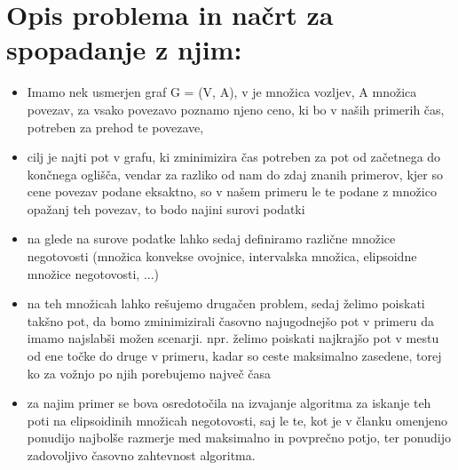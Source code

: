 \documentclass[a4paper, 12 pt]{article}
\theoremstyle{plain}
\theoremstyle{definition}
\theoremstyle{remark}
\begin{document}
\section{Opis problema in načrt za spopadanje z njim:}
\begin{itemize}
\item{Imamo nek usmerjen graf G = (V, A), v je množica vozljev, A množica povezav, za vsako povezavo poznamo njeno ceno, ki bo v naših primerih čas, potreben za prehod te povezave,}
\item{cilj je najti pot v grafu, ki zminimizira čas potreben za pot od začetnega do končnega oglišča, vendar za razliko od nam do zdaj znanih primerov, kjer so cene povezav podane eksaktno, so v našem primeru le te podane z množico opažanj teh povezav, to bodo najini surovi podatki}
\item{na glede na surove podatke lahko sedaj definiramo različne množice negotovosti (množica konvekse ovojnice, intervalska množica, elipsoidne množice negotovosti, ...)}
\item{na teh množicah lahko rešujemo drugačen problem, sedaj želimo poiskati takšno pot, da bomo zminimizirali časovno najugodnejšo pot v primeru da imamo najslabši možen scenarji. npr. želimo poiskati najkrajšo pot v mestu od ene točke do druge v primeru, kadar so ceste maksimalno zasedene, torej ko za vožnjo po njih porebujemo največ časa}
\item{za najim primer se bova osredotočila na izvajanje algoritma za iskanje teh poti na elipsoidinih množicah negotovosti, saj le te, kot je v članku omenjeno ponudijo najbolše razmerje med maksimalno in povprečno potjo, ter ponudijo zadovoljivo časovno zahtevnost algoritma.}
\end{itemize}
\end{document}
